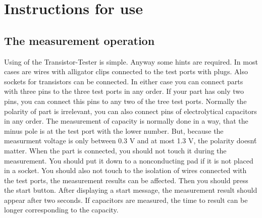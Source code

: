 \chapter{Instructions for use}
\label{sec:manual}
\section{The measurement operation}
Using of the Transistor-Tester is simple.
Anyway some hints are required.
In most cases are wires with alligator clips connected to the test ports with plugs.
Also sockets for transistors can be connected.
In either case you can connect parts with three pins to the three test ports in any order.
If your part has only two pins, you can connect this pins to any two of the tree test ports.
Normally the polarity of part is irrelevant, you can also connect pins of electrolytical capacitors in any order. 
The measurement of capacity is normally done in a way, that the minus pole is at the test port with the lower number.
But, because the measurment voltage is only between 0.3 V and at most 1.3 V, the polarity doesn\'t matter.
When the part is connected, you should not touch it during the measurement. You should put it down to a nonconducting pad
if it is not placed in a socket. You should also not touch to the isolation of wires connected with the test ports,
the measurement results can be affected.
Then you should press the start button.
After displaying a start message, the measurement result should appear after two seconds.
If capacitors are measured, the time to result can be longer corresponding to the capacity.

